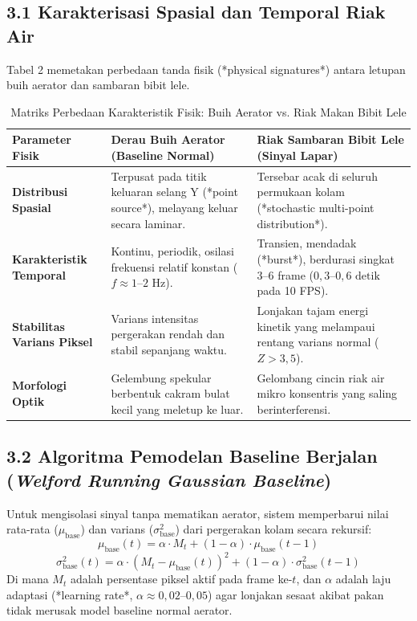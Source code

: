 \documentclass[10pt,a4paper]{article}
\providecommand{\text}[1]{\mbox{#1}}
\begin{document}
\subsection*{3.1 Karakterisasi Spasial dan Temporal Riak Air}
Tabel 2 memetakan perbedaan tanda fisik (*physical signatures*) antara letupan buih aerator dan sambaran bibit lele.

\begin{table}[h!]
\centering
\small
\setlength{\tabcolsep}{3pt}
\caption{Matriks Perbedaan Karakteristik Fisik: Buih Aerator vs. Riak Makan Bibit Lele}
\label{tab:karakteristik-gerak}
\begin{tabular}{|p{3.2cm}|p{6.8cm}|p{6.8cm}|}
\hline
\textbf{Parameter Fisik} & \textbf{Derau Buih Aerator (Baseline Normal)} & \textbf{Riak Sambaran Bibit Lele (Sinyal Lapar)} \\
\hline
\textbf{Distribusi Spasial} & Terpusat pada titik keluaran selang Y (*point source*), melayang keluar secara laminar. & Tersebar acak di seluruh permukaan kolam (*stochastic multi-point distribution*). \\
\hline
\textbf{Karakteristik Temporal} & Kontinu, periodik, osilasi frekuensi relatif konstan ($f \approx 1\text{--}2\text{ Hz}$). & Transien, mendadak (*burst*), berdurasi singkat 3--6 frame ($0,3\text{--}0,6\text{ detik}$ pada 10 FPS). \\
\hline
\textbf{Stabilitas Varians Piksel} & Varians intensitas pergerakan rendah dan stabil sepanjang waktu. & Lonjakan tajam energi kinetik yang melampaui rentang varians normal ($Z > 3,5$). \\
\hline
\textbf{Morfologi Optik} & Gelembung spekular berbentuk cakram bulat kecil yang meletup ke luar. & Gelombang cincin riak air mikro konsentris yang saling berinterferensi. \\
\hline
\end{tabular}
\end{table}

\subsection*{3.2 Algoritma Pemodelan Baseline Berjalan (\textit{Welford Running Gaussian Baseline})}
Untuk mengisolasi sinyal tanpa mematikan aerator, sistem memperbarui nilai rata-rata ($\mu_{\text{base}}$) dan varians ($\sigma_{\text{base}}^2$) dari pergerakan kolam secara rekursif:
\begin{equation}
\mu_{\text{base}}(t) = \alpha \cdot M_t + (1 - \alpha) \cdot \mu_{\text{base}}(t-1)
\end{equation}
\begin{equation}
\sigma_{\text{base}}^2(t) = \alpha \cdot (M_t - \mu_{\text{base}}(t))^2 + (1 - \alpha) \cdot \sigma_{\text{base}}^2(t-1)
\end{equation}
Di mana $M_t$ adalah persentase piksel aktif pada frame ke-$t$, dan $\alpha$ adalah laju adaptasi (*learning rate*, $\alpha \approx 0,02\text{--}0,05$) agar lonjakan sesaat akibat pakan tidak merusak model baseline normal aerator.
\end{document}
